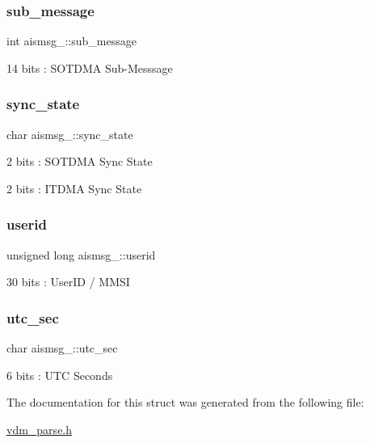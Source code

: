 \mbox{\label{structaismsg__9_a9d2f899ec16707fbbf0d4ad5ab6c8b48}} 
\subsubsection{\texorpdfstring{sub\+\_\+message}{sub\_message}}
{\footnotesize\ttfamily int aismsg\+\_\+::sub\+\_\+message}



14 bits \+: S\+O\+T\+D\+MA Sub-\/\+Messsage 

\mbox{\label{structaismsg__9_ab8d3e28d3fd5dd63dfbabb062542bc2e}} 
\subsubsection{\texorpdfstring{sync\+\_\+state}{sync\_state}}
{\footnotesize\ttfamily char aismsg\+\_\+::sync\+\_\+state}



2 bits \+: S\+O\+T\+D\+MA Sync State 

2 bits \+: I\+T\+D\+MA Sync State \mbox{\label{structaismsg__9_a59d55a49e7c75c17c37d407c6fa7cf8d}} 
\subsubsection{\texorpdfstring{userid}{userid}}
{\footnotesize\ttfamily unsigned long aismsg\+\_\+::userid}



30 bits \+: User\+ID / M\+M\+SI 

\mbox{\label{structaismsg__9_a83ae2d2e1685c564df365bc1bdc1c419}} 
\subsubsection{\texorpdfstring{utc\+\_\+sec}{utc\_sec}}
{\footnotesize\ttfamily char aismsg\+\_\+::utc\+\_\+sec}



6 bits \+: U\+TC Seconds 



The documentation for this struct was generated from the following file\+:\begin{DoxyCompactItemize}
\item 
\mbox{\hyperlink{vdm__parse_8h}{vdm\+\_\+parse.\+h}}\end{DoxyCompactItemize}
